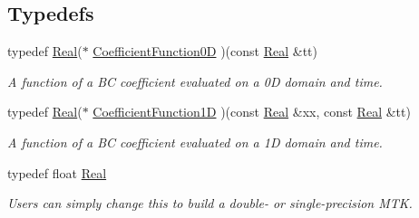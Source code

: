 \subsection*{Typedefs}
\begin{DoxyCompactItemize}
\item 
typedef \hyperlink{group__c01-roots_gac080bbbf5cbb5502c9f00405f894857d}{Real}($\ast$ \hyperlink{group__c07-mim__ops_ga04276745b4d511f0f3c636d6e0df7c2d}{Coefficient\+Function0\+D} )(const \hyperlink{group__c01-roots_gac080bbbf5cbb5502c9f00405f894857d}{Real} \&tt)
\begin{DoxyCompactList}\small\item\em A function of a B\+C coefficient evaluated on a 0\+D domain and time. \end{DoxyCompactList}\item 
typedef \hyperlink{group__c01-roots_gac080bbbf5cbb5502c9f00405f894857d}{Real}($\ast$ \hyperlink{group__c07-mim__ops_gaa79593eeb6676d6011db339e01983909}{Coefficient\+Function1\+D} )(const \hyperlink{group__c01-roots_gac080bbbf5cbb5502c9f00405f894857d}{Real} \&xx, const \hyperlink{group__c01-roots_gac080bbbf5cbb5502c9f00405f894857d}{Real} \&tt)
\begin{DoxyCompactList}\small\item\em A function of a B\+C coefficient evaluated on a 1\+D domain and time. \end{DoxyCompactList}\item 
typedef float \hyperlink{group__c01-roots_gac080bbbf5cbb5502c9f00405f894857d}{Real}
\begin{DoxyCompactList}\small\item\em Users can simply change this to build a double-\/ or single-\/precision M\+T\+K. \end{DoxyCompactList}\end{DoxyCompactItemize}
